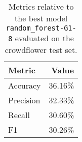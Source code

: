 \begin{table}[H]
\centering
\begin{tabularx}{0.48\textwidth}{|X|r|}
\hline
Metric & Value \\
\hline
Accuracy & 36.16\% \\
Precision & 32.33\% \\
Recall & 30.60\% \\
F1 & 30.26\% \\
\hline
\end{tabularx}
\caption{Metrics relative to the best model \texttt{random\_forest-G1-8} evaluated on the crowdflower test set.}
\label{tab:best_model_metrics_crowdflower_test}

\end{table}
